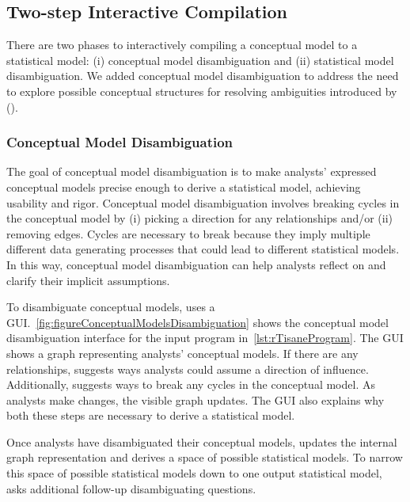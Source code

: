 \subsection{Two-step Interactive Compilation}
There are two phases to interactively compiling a conceptual model to a
statistical model: (i) conceptual model disambiguation and (ii) statistical
model disambiguation. We added conceptual model disambiguation to address the
need to explore possible conceptual structures for resolving ambiguities
introduced by \relates (\considerPossibilities).

\subsubsection{Conceptual Model Disambiguation} \label{subsec:conceptualModelDisambig} 
\conceptualModelDisambiguation
The goal of conceptual model disambiguation is to make analysts' expressed
conceptual models precise enough to derive a statistical model, achieving
usability and rigor. Conceptual model disambiguation involves breaking cycles in
the conceptual model by (i) picking a direction for any \relates relationships
and/or (ii) removing edges. Cycles are necessary to break because they imply
multiple different data generating processes that could lead to different
statistical models. In this way, conceptual model disambiguation can help analysts
reflect on and clarify their implicit assumptions. 

To disambiguate conceptual models, \rTisane uses a GUI.~\autoref{fig:figureConceptualModelsDisambiguation} shows the conceptual model disambiguation interface for the input program in~\autoref{lst:rTisaneProgram}. The GUI shows a graph
representing analysts' conceptual models. If there are any \relates
relationships, \rTisane suggests ways analysts could assume a direction of
influence. Additionally, \rTisane suggests ways to break any cycles in the
conceptual model. As analysts make changes, the visible graph updates. The GUI
also explains why both these steps are necessary to derive a statistical model. 

Once analysts have disambiguated their conceptual models, \rTisane updates the
internal graph representation and derives a space of possible statistical
models. To narrow this space of possible statistical models down to one output
statistical model, \rTisane asks additional follow-up disambiguating questions. 

\begin{comment}
This problem is actually challenging because detecting all cycles in a graph is
an NP-hard problem. We adapt a version of Johnson's(?) algorithm.
\end{comment}

